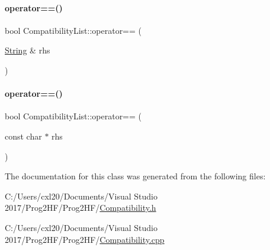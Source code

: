 \paragraph{\texorpdfstring{operator==()}{operator==()}\hspace{0.1cm}{\footnotesize\ttfamily [1/2]}}
{\footnotesize\ttfamily bool Compatibility\+List\+::operator== (\begin{DoxyParamCaption}\item[{\mbox{\hyperlink{class_string}{String}} \&}]{rhs }\end{DoxyParamCaption})\hspace{0.3cm}{\ttfamily [inline]}}

\mbox{\label{class_compatibility_list_ad476ceb7026c6316112d5f11b283357e}} 
\paragraph{\texorpdfstring{operator==()}{operator==()}\hspace{0.1cm}{\footnotesize\ttfamily [2/2]}}
{\footnotesize\ttfamily bool Compatibility\+List\+::operator== (\begin{DoxyParamCaption}\item[{const char $\ast$}]{rhs }\end{DoxyParamCaption})\hspace{0.3cm}{\ttfamily [inline]}}



The documentation for this class was generated from the following files\+:\begin{DoxyCompactItemize}
\item 
C\+:/\+Users/cxl20/\+Documents/\+Visual Studio 2017/\+Prog2\+H\+F/\+Prog2\+H\+F/\mbox{\hyperlink{_compatibility_8h}{Compatibility.\+h}}\item 
C\+:/\+Users/cxl20/\+Documents/\+Visual Studio 2017/\+Prog2\+H\+F/\+Prog2\+H\+F/\mbox{\hyperlink{_compatibility_8cpp}{Compatibility.\+cpp}}\end{DoxyCompactItemize}
